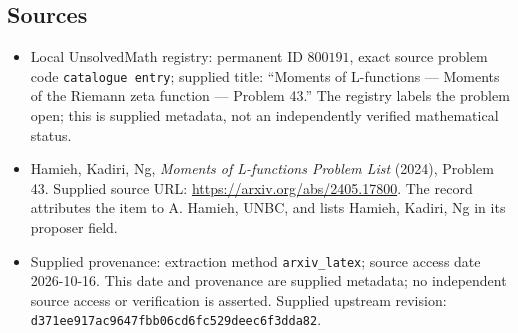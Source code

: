 \documentclass[11pt]{article}
\begin{document}
\subsection{Sources}
\begin{itemize}
\item Local UnsolvedMath registry: permanent ID \(800191\), exact source problem code \texttt{catalogue entry}; supplied title: ``Moments of L-functions --- Moments of the Riemann zeta function --- Problem 43.'' The registry labels the problem open; this is supplied metadata, not an independently verified mathematical status.
\item Hamieh, Kadiri, Ng, \emph{Moments of L-functions Problem List} (2024), Problem 43. Supplied source URL: \url{https://arxiv.org/abs/2405.17800}. The record attributes the item to A. Hamieh, UNBC, and lists Hamieh, Kadiri, Ng in its proposer field.
\item Supplied provenance: extraction method \texttt{arxiv\_latex}; source access date 2026-10-16. This date and provenance are supplied metadata; no independent source access or verification is asserted. Supplied upstream revision: \texttt{d371ee917ac9647fbb06cd6fc529deec6f3dda82}.
\end{itemize}
\end{document}
